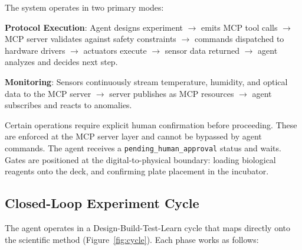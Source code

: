 \documentclass[11pt,letterpaper]{article}
\begin{document}
The system operates in two primary modes:

\textbf{Protocol Execution}: Agent designs experiment $\rightarrow$ emits MCP tool calls $\rightarrow$ MCP server validates against safety constraints $\rightarrow$ commands dispatched to hardware drivers $\rightarrow$ actuators execute $\rightarrow$ sensor data returned $\rightarrow$ agent analyzes and decides next step.

\textbf{Monitoring}: Sensors continuously stream temperature, humidity, and optical data to the MCP server $\rightarrow$ server publishes as MCP resources $\rightarrow$ agent subscribes and reacts to anomalies.

\begin{safetybox}
Certain operations require explicit human confirmation before proceeding. These are enforced at the MCP server layer and cannot be bypassed by agent commands. The agent receives a \texttt{pending\_human\_approval} status and waits. Gates are positioned at the digital-to-physical boundary: loading biological reagents onto the deck, and confirming plate placement in the incubator.
\end{safetybox}

\subsection{Closed-Loop Experiment Cycle}

The agent operates in a Design-Build-Test-Learn cycle that maps directly onto the scientific method (Figure~\ref{fig:cycle}). Each phase works as follows:
\end{document}
